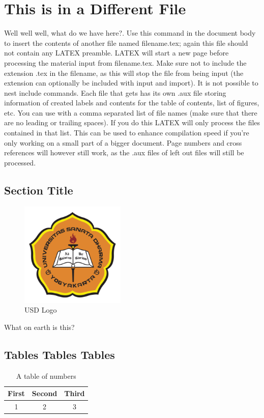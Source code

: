 \chapter{This is in a Different File}
Well well well, what do we have here?. Use this command in the document body to insert the contents of another file named filename.tex; again this file should not contain any LATEX preamble. LATEX will start a new page before processing the material input from filename.tex. Make sure not to include the extension .tex in the filename, as this will stop the file from being input (the extension can optionally be included with input and import). It is not possible to nest include commands. Each file that gets has its own .aux file storing information of created labels and contents for the table of contents, list of figures, etc. You can use  with a comma separated list of file names (make sure that there are no leading or trailing spaces). If you do this LATEX will only process the files contained in that list. This can be used to enhance compilation speed if you're only working on a small part of a bigger document. Page numbers and cross references will however still work, as the .aux files of left out files will still be processed.
\section{Section Title}

\begin{figure}[H] %

	\centering
	\includegraphics[width=5cm]{usd}
	\caption{USD Logo}
\end{figure}

What on earth is this?

\lipsum[1-2]

\section{Tables Tables Tables}

\begin{table}[h]
	\caption{A table of numbers}
	\begin{center}
		\begin{tabular}{|c|c|c|}
				\hline
			First&Second&Third\\
				\hline
			1&2&3\\
				\hline
		\end{tabular}
	\end{center}
\end{table}

